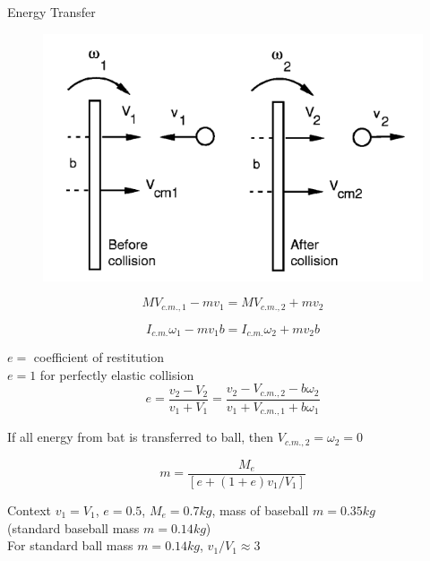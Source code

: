 \documentclass[tikz]{beamer}
\begin{document}
\begin{frame} {Energy Transfer}
{    		\begin{figure}
		    \centering
		\end{figure}
	}
	 {
		\begin{figure}
			\centering
			\includegraphics[scale=0.4]{momentumtransfer.png}
		\end{figure}
		\begin{equation}
			M V_{c.m.,1} - mv_1 = M V_{c.m.,2} + mv_2 \tag{15}
		\end{equation}

		\begin{equation}
			I_{c.m.} \omega_1 - mv_1b=I_{c.m.} \omega_2 + mv_2b \tag{16}
		\end{equation}
	}
	 {
		$e =$ coefficient of restitution\\
		$e=1$ for perfectly elastic collision\\
		\begin{equation}
			e=\frac{v_2 - V_2}{v_1 + V_1} = \frac{v_2 - V_{c.m.,2} - b \omega_2}{v_1 + V_{c.m.,1} + b \omega_1} \tag{17}
		\end{equation}

		If all energy from bat is transferred to ball, then $V_{c.m.,2} = \omega_2 = 0$

		\begin{equation}
			m= \frac{M_e}{[e+(1+e)v_1/V_1]} \tag{18}
		\end{equation}
	}
\end{frame}

\begin{frame} {Context}
	$v_1 = V_1$, $e=0.5$, $M_e=0.7 kg$, mass of baseball $m=0.35 kg$\\ (standard baseball mass $m=0.14 kg$)\\
	\vspace{\baselineskip}
	For standard ball mass $m=0.14 kg$, $v_1 / V_1 \approx 3$
\end{frame}
\end{document}
